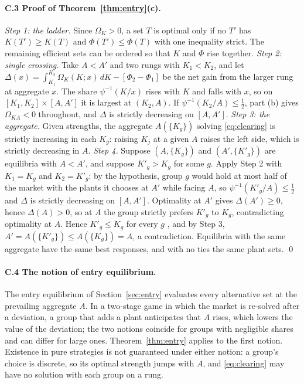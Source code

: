 \documentclass[11pt]{article}
\begin{document}
\paragraph{C.3 Proof of Theorem~\ref{thm:entry}(c).} \emph{Step 1: the ladder.} Since
$\Omega_K>0$, a set $T$ is optimal only if no $T'$ has $K(T')\ge K(T)$ and
$\Phi(T')\le\Phi(T)$ with one inequality strict. The remaining efficient sets can be
ordered so that $K$ and $\Phi$ rise together. \emph{Step 2: single crossing.} Take
$A<A'$ and two rungs with $K_1<K_2$, and let
$\Delta(x)=\int_{K_1}^{K_2}\Omega_K(K;x)\,dK-[\Phi_2-\Phi_1]$ be the net gain from the
larger rung at aggregate $x$. The share $\psi^{-1}(K/x)$ rises with $K$ and falls with
$x$, so on $[K_1,K_2]\times[A,A']$ it is largest at $(K_2,A)$. If
$\psi^{-1}(K_2/A)\le\frac12$, part (b) gives $\Omega_{KA}<0$ throughout, and $\Delta$
is strictly decreasing on $[A,A']$. \emph{Step 3: the aggregate.} Given strengths, the
aggregate $A(\{K_g\})$ solving \eqref{eq:clearing} is strictly increasing in each $K_g$:
raising $K_j$ at a given $A$ raises the left side, which is strictly decreasing in $A$.
\emph{Step 4.} Suppose $(A,\{K_g\})$ and $(A',\{K'_g\})$ are equilibria with $A<A'$,
and suppose $K'_g>K_g$ for some $g$. Apply Step 2 with $K_1=K_g$ and $K_2=K'_g$: by the
hypothesis, group $g$ would hold at most half of the market with the plants it chooses
at $A'$ while facing $A$, so $\psi^{-1}(K'_g/A)\le\frac12$ and $\Delta$ is strictly
decreasing on $[A,A']$. Optimality at $A'$ gives $\Delta(A')\ge0$, hence $\Delta(A)>0$,
so at $A$ the group strictly prefers $K'_g$ to $K_g$, contradicting optimality at $A$.
Hence $K'_g\le K_g$ for every $g$ \citep[the single-crossing argument of][]{MilgromShannon1994},
and by Step 3, $A'=A(\{K'_g\})\le A(\{K_g\})=A$, a contradiction. Equilibria with the
same aggregate have the same best responses, and with no ties the same plant sets.
\qed

\paragraph{C.4 The notion of entry equilibrium.} The entry equilibrium of
Section~\ref{sec:entry} evaluates
every alternative set at the prevailing aggregate $A$. In a two-stage game in which the
market is re-solved after a deviation, a group that adds a plant anticipates that $A$
rises, which lowers the value of the deviation; the two notions coincide for groups
with negligible shares and can differ for large ones. Theorem~\ref{thm:entry} applies to
the first notion. Existence in pure strategies is not guaranteed
under either notion: a group's choice is discrete, so its optimal strength jumps with
$A$, and \eqref{eq:clearing} may have no solution with each group on a rung.
\end{document}
